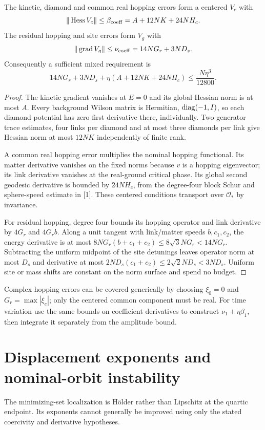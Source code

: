 \documentclass[11pt,a4paper]{article}
\begin{document}
\begin{lemma}\label{lem:coeff}
The kinetic, diamond and common real hopping errors form a centered $V_c$ with
\[
\|\operatorname{Hess}V_c\|\le\beta_{\rm coeff}=A+12NK+24NH_c.
\]
The residual hopping and site errors form $V_g$ with
\[
\|\operatorname{grad} V_g\|\le\nu_{\rm coeff}=14NG_r+3ND_s.
\]
Consequently a sufficient mixed requirement is
\[
\boxed{14NG_r+3ND_s+\eta(A+12NK+24NH_c)
\le\frac{N\eta^3}{12800}.}
\]
\end{lemma}
\begin{proof}
The kinetic gradient vanishes at $E=0$ and its global Hessian norm is at most $A$. Every background Wilson matrix is Hermitian, $\operatorname{diag}(-1,I)$, so each diamond potential has zero first derivative there, individually. Two-generator trace estimates, four links per diamond and at most three diamonds per link give Hessian norm at most $12NK$ independently of finite rank.

A common real hopping error multiplies the nominal hopping functional. Its matter derivative vanishes on the fixed norms because $v$ is a hopping eigenvector; its link derivative vanishes at the real-ground critical phase. Its global second geodesic derivative is bounded by $24NH_c$, from the degree-four block Schur and sphere-speed estimate in [1]. These centered conditions transport over $\mathcal O_*$ by invariance.

For residual hopping, degree four bounds its hopping operator and link derivative by $4G_r$ and $4G_r b$. Along a unit tangent with link/matter speeds $b,c_1,c_2$, the energy derivative is at most $8NG_r(b+c_1+c_2)\le8\sqrt3NG_r<14NG_r$. Subtracting the uniform midpoint of the site detunings leaves operator norm at most $D_s$ and derivative at most $2ND_s(c_1+c_2)\le2\sqrt2ND_s<3ND_s$. Uniform site or mass shifts are constant on the norm surface and spend no budget.
\end{proof}
Complex hopping errors can be covered generically by choosing $\xi_0=0$ and $G_r=\max|\xi_e|$; only the centered common component must be real. For time variation use the same bounds on coefficient derivatives to construct $\nu_1+\eta\beta_1$, then integrate it separately from the amplitude bound.
\newpage
\section{Displacement exponents and nominal-orbit instability}
The minimizing-set localization is H\"older rather than Lipschitz at the quartic endpoint. Its exponents cannot generally be improved using only the stated coercivity and derivative hypotheses.
\end{document}

